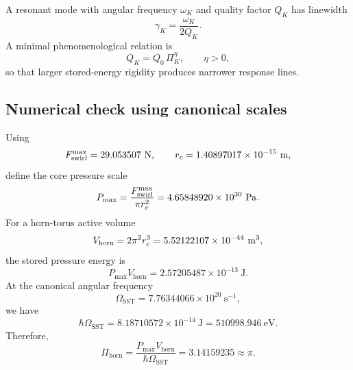         A resonant mode with angular frequency \(\omega_K\) and quality factor \(Q_K\) has linewidth
        \begin{equation}
            \gamma_K
            =
            \frac{\omega_K}{2Q_K}.
            \label{eq:linewidth_quality_factor}
        \end{equation}
        A minimal phenomenological relation is
        \begin{equation}
            Q_K
            =
            Q_0\,\Pi_K^\eta,
            \qquad
            \eta>0,
            \label{eq:Q_rigidity_ansatz}
        \end{equation}
        so that larger stored-energy rigidity produces narrower response lines.
    
    \subsection*{Numerical check using canonical scales}
        
        Using
        \[
            \Fswirlmax = 29.053507\ \mathrm{N},
            \qquad
            \rc = 1.40897017\times10^{-15}\ \mathrm{m},
        \]
        define the core pressure scale
        \begin{equation}
            P_{\max}
            =
            \frac{F_{\text{swirl}}^{\max}}{\pi r_c^2}
            =
            4.65848920\times10^{30}\ \mathrm{Pa}.
            \label{eq:Pmax_numeric}
        \end{equation}
        For a horn-torus active volume
        \begin{equation}
            V_{\mathrm{horn}}
            =
            2\pi^2 r_c^3
            =
            5.52122107\times10^{-44}\ \mathrm{m^3},
            \label{eq:horn_volume_numeric}
        \end{equation}
        the stored pressure energy is
        \begin{equation}
            P_{\max}V_{\mathrm{horn}}
            =
            2.57205487\times10^{-13}\ \mathrm{J}.
            \label{eq:pressure_energy_numeric}
        \end{equation}
        At the canonical angular frequency
        \[
            \Omega_{\mathrm{SST}}
            =
            7.76344066\times10^{20}\ \mathrm{s^{-1}},
        \]
        we have
        \begin{equation}
            \hbar\Omega_{\mathrm{SST}}
            =
            8.18710572\times10^{-14}\ \mathrm{J}
            =
            510998.946\ \mathrm{eV}.
            \label{eq:hbarOmega_numeric}
        \end{equation}
        Therefore,
        \begin{equation}
            \Pi_{\mathrm{horn}}
            =
            \frac{P_{\max}V_{\mathrm{horn}}}
            {\hbar\Omega_{\mathrm{SST}}}
            =
            3.14159235
            \approx \pi.
            \label{eq:Pi_horn_numeric}
        \end{equation}
    
